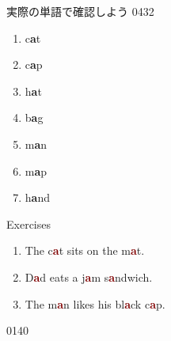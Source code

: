 \documentclass[aspectratio=169,xcolor={dvipsnames,table}]{beamer}
\begin{document}
\begin{frame}[plain]{実際の単語で確認しよう}
\LARGE
\hfill{\tiny 0432}\,{\scriptsize {}}

\begin{enumerate}
 \item c\textcolor{NavyBlue}{\bfseries a}t%
\hfill{}\hspace{150pt}\mbox{}
 \item c\textcolor{NavyBlue}{\bfseries a}p
\hfill{}\hspace{150pt}\mbox{}
 \item h\textcolor{NavyBlue}{\bfseries a}t
\hfill{}\hspace{150pt}\mbox{}
 \item b\textcolor{NavyBlue}{\bfseries a}g
\hfill{}\hspace{150pt}\mbox{}
 \item m\textcolor{NavyBlue}{\bfseries a}n
\hfill{}\hspace{150pt}\mbox{}
 \item m\textcolor{NavyBlue}{\bfseries a}p
\hfill{}\hspace{150pt}\mbox{}
 \item h\textcolor{NavyBlue}{\bfseries a}nd
\hfill{}\hspace{150pt}\mbox{}
\end{enumerate}
\end{frame}
\begin{frame}[plain]{Exercises \textipa{/\ae /}}
\LARGE

\begin{enumerate}
 \item The c\textcolor{Maroon}{\bfseries a}t sits on the m\textcolor{Maroon}{\bfseries a}t.
 \item D\textcolor{Maroon}{\bfseries a}d eats a j\textcolor{Maroon}{\bfseries a}m s\textcolor{Maroon}{\bfseries a}ndwich.
 \item The m\textcolor{Maroon}{\bfseries a}n likes his bl\textcolor{Maroon}{\bfseries a}ck c\textcolor{Maroon}{\bfseries a}p.
\end{enumerate}

\hfill{\tiny 0140}\,{\scriptsize {}}

\end{frame}
\end{document}
